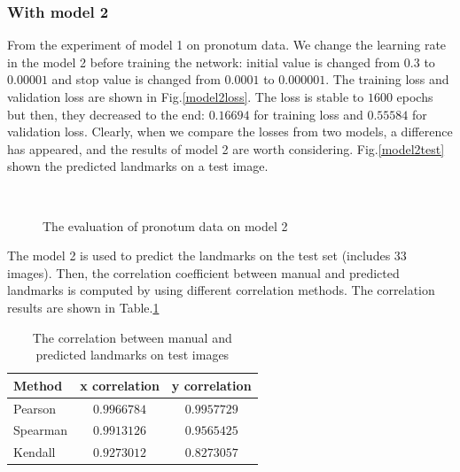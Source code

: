 \documentclass[12pt,a4paper]{article}
\begin{document}
\subsubsection{With model 2}
From the experiment of model 1 on pronotum data. We change the learning rate in the model 2 before training the network: initial value is changed from $0.3$ to $0.00001$ and stop value is changed from $0.0001$ to $0.000001$. The training loss and validation loss are shown in Fig.\ref{model2loss}. The loss is stable to $1600$ epochs but then, they decreased to the end: $0.16694$ for training loss and $0.55584$ for validation loss. Clearly, when we compare the losses from two models, a difference has appeared, and the results of model 2 are worth considering. Fig.\ref{model2test} shown the predicted landmarks on a test image.
\begin{figure}[h!]
\centering
{}~~
\caption{The evaluation of pronotum data on model 2}
\label{model2tl}
\end{figure}
The model 2 is used to predict the landmarks on the test set (includes 33 images). Then, the correlation coefficient between manual and predicted landmarks is computed by using different correlation methods\cite{pallant2013spss,myers2010research,kendall1938new}. The correlation results are shown in Table.\ref{corr1}
\begin{table}[h!]
	\centering
	\begin{tabular}{l c c}
		Method & x correlation & y correlation \\ \hline
		Pearson & $0.9966784$ & $0.9957729$ \\ \hline
		Spearman & $0.9913126$ & $0.9565425$ \\ \hline
		Kendall & $0.9273012$ & $0.8273057$ \\ \hline
	\end{tabular}
	\caption{The correlation between manual and predicted landmarks on test images}
	\label{corr1}
\end{table}~\\[0.5cm]
\end{document}
